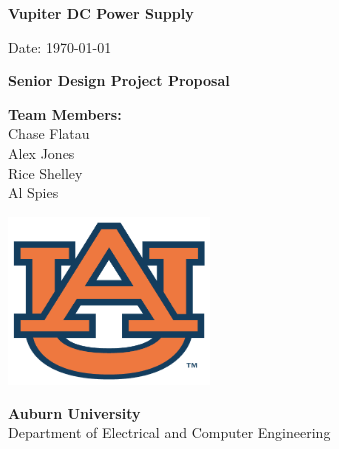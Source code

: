 \documentclass[12pt]{article}
\begin{document}
\begin{titlepage}
    \begin{center}
        \vspace*{1cm}
            
        \Huge
        \textbf{Vupiter DC Power Supply}
            
        \vspace{0.5cm}
        \large
        Date: \today
            
        \vspace{4.5cm}

        \textbf{Senior Design Project Proposal}
        
        \vspace{1cm}

        \textbf{Team Members:}\\
        Chase Flatau\\
        Alex Jones\\
        Rice Shelley\\
        Al Spies
        \vfill
            
            
        \vspace{0.8cm}
            
        \includegraphics[width=0.4\textwidth]{university}
            
        \Large

        \textbf{Auburn University}\\
        Department of Electrical and Computer Engineering\\

            
    \end{center}
\end{titlepage}

\tableofcontents
\pagebreak
\end{document}
